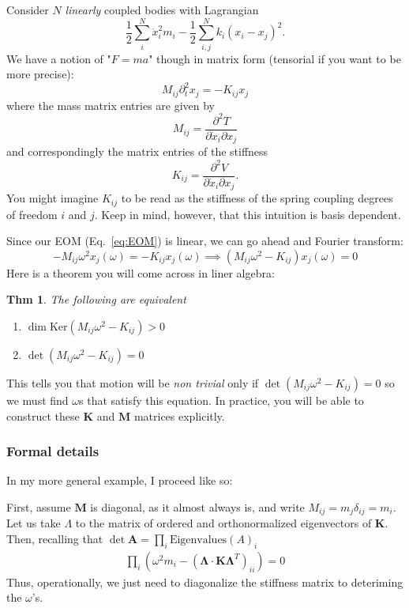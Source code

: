 \documentclass{article}
\newtheorem*{theorem}{Thm}
\theoremstyle{definition}
\theoremstyle{remark}
\theoremstyle{example}
\begin{document}
Consider $N$ \emph{linearly} coupled bodies with Lagrangian
$$
\frac{1}{2}\sum_i^N \dot x_i^2 m_i - \frac{1}{2}\sum_{i,j}^N k_{i}(x_i-x_j)^2.
$$
We have a notion of "$F=ma$" though in matrix form (tensorial if you want to be more precise):
\begin{equation}\label{eq:EOM}
M_{ij}\partial_t^2x_j = -K_{ij}x_j
\end{equation}
where the mass matrix entries are given by
$$
M_{ij} = \frac{\partial^2 T}{\partial\dot x_i\partial x_j}
$$
and correspondingly the matrix entries of the stiffness 
$$
K_{ij} = \frac{\partial^2 V}{\partial\dot x_i\partial x_j}.
$$
You might imagine $K_{ij}$ to be read as the stiffness of the spring coupling degrees of freedom $i$ and $j$. Keep in mind, however, that this intuition is basis dependent. 

Since our EOM (Eq.~\ref{eq:EOM}) is linear, we can go ahead and Fourier transform:
 $$
 -M_{ij}\omega^2x_j(\omega) = -K_{ij}x_j(\omega)\implies (M_{ij}\omega^2-K_{ij})x_{j}(\omega)=0
 $$
 Here is a theorem you will come across in liner algebra:
\begin{theorem}
The following are equivalent
\begin{enumerate}
  \item $\dim\text{Ker} (M_{ij}\omega^2-K_{ij})>0$
  \item $\det (M_{ij}\omega^2-K_{ij})=0$
\end{enumerate}
\end{theorem}
This tells you that motion will be \emph{non trivial} only if $\det (M_{ij}\omega^2-K_{ij})=0$ so we must find $\omega$s that satisfy this equation. In practice, you will be able to construct these $\mathbf K$ and $\mathbf M$ matrices explicitly.

\subsubsection*{Formal details}

In my more general example, I proceed like so:

First, assume $\mathbf M$ is diagonal, as it almost always is, and write $M_{ij}=m_j\delta_{ij}=m_i$. Let us take $\Lambda$ to the matrix of ordered and orthonormalized eigenvectors of $\mathbf K$. Then, recalling that $\det \mathbf A = \prod_i \text{Eigenvalues}(A)_i$
\begin{align*}
  \prod_{i}(\omega^2m_i -(\mathbf\Lambda\cdot \mathbf K\mathbf\Lambda^T)_{ii})=0
\end{align*}
Thus, operationally, we just need to diagonalize the stiffness matrix to deteriming the $\omega$'s.
\end{document}
